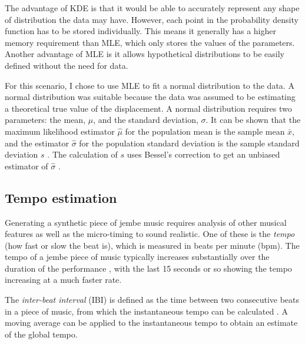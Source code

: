 \documentclass[12pt,twoside,openright]{report}
\begin{document}
The advantage of KDE is that it would be able to accurately represent any shape
of distribution the data may have. However, each point in
the probability density function has to be stored individually. This means it generally has a higher memory
requirement than MLE, which only stores the values of the parameters. Another
advantage of MLE is it allows hypothetical distributions to be easily defined
without the need for data.

For this scenario, I chose to use MLE to fit a normal distribution to the data.
A normal distribution was suitable because the data was assumed to be estimating
a theoretical true value of the displacement. A normal distribution requires two
parameters: the mean, $\mu$, and the standard deviation, $\sigma$. It can be shown that the maximum likelihood estimator $\hat{\mu}$ for the population mean is the sample mean $\bar{x}$, and the estimator $\hat{\sigma}$ for the population standard deviation is the sample standard deviation $s$ \cite{dekking2005}. The calculation of $s$ uses Bessel's
correction to get an unbiased estimator of $\hat{\sigma}$ \cite{upton2014}.


\subsection{Tempo estimation} \label{tempo_estimation}

Generating a synthetic piece of jembe music requires analysis of other musical
features as well as the micro-timing to sound realistic. One of these is the
\emph{tempo} (how fast or slow the beat is), which is measured in beats per minute
(bpm). The tempo of a jembe piece of music typically increases substantially
over the duration of the performance \cite{jacoby2021}, with the last 15 seconds or
so showing the tempo increasing at a much faster rate.

The \emph{inter-beat interval} (IBI) is defined as the time between two consecutive beats in a
piece of music, from which the instantaneous tempo can be calculated \cite{dixon2001}.
A moving average can be applied to the instantaneous tempo to obtain an estimate
of the global tempo.
\end{document}
